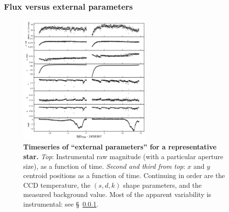 \documentclass[12pt,twocolumn,tighten]{aastex62}
\begin{document}
\subsubsection{Flux versus external parameters}
\label{sec:flux_vs_external_parameters}

\begin{figure}[t]
	\begin{center}
		\leavevmode
		\includegraphics[width=0.6\textwidth]{epdparams_vs_time.png}
	\end{center}
	\vspace{-0.5cm}
	\caption{
    {\bf Timeseries of ``external parameters'' for a representative
    star.} {\it Top}: Instrumental raw magnitude (with a particular
    aperture size), as a function of time.  {\it Second and third from
    top}: $x$ and $y$ centroid positions as a function of time.
    Continuing in order are the CCD temperature, the $(s,d,k)$ shape
    parameters, and the measured background value.
    Most of the apparent variability is instrumental: see
    \S~\ref{sec:flux_vs_external_parameters}.
		\label{fig:external_parameter_timeseries}
	}
\end{figure}
\end{document}
